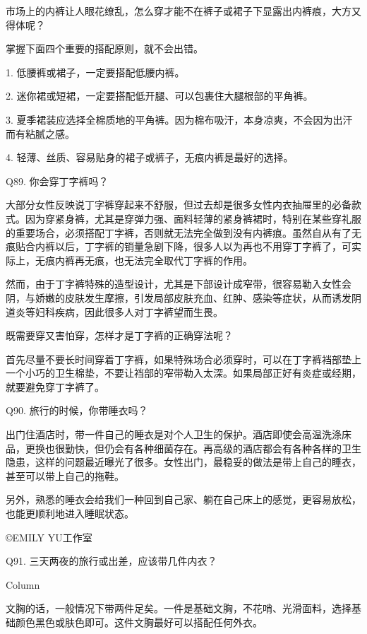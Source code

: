 \documentclass[12pt,UTF8]{ctexbook}
\begin{document}
市场上的内裤让人眼花缭乱，怎么穿才能不在裤子或裙子下显露出内裤痕，大方又得体呢？


掌握下面四个重要的搭配原则，就不会出错。

1. 低腰裤或裙子，一定要搭配低腰内裤。

2. 迷你裙或短裙，一定要搭配低开腿、可以包裹住大腿根部的平角裤。

3. 夏季裙装应选择全棉质地的平角裤。因为棉布吸汗，本身凉爽，不会因为出汗而有粘腻之感。

4. 轻薄、丝质、容易贴身的裙子或裤子，无痕内裤是最好的选择。





Q89. 你会穿丁字裤吗？


大部分女性反映说丁字裤穿起来不舒服，但过去却是很多女性内衣抽屉里的必备款式。因为穿紧身裤，尤其是穿弹力强、面料轻薄的紧身裤裙时，特别在某些穿礼服的重要场合，必须搭配丁字裤，否则就无法完全做到没有内裤痕。虽然自从有了无痕贴合内裤以后，丁字裤的销量急剧下降，很多人以为再也不用穿丁字裤了，可实际上，无痕内裤再无痕，也无法完全取代丁字裤的作用。

然而，由于丁字裤特殊的造型设计，尤其是下部设计成窄带，很容易勒入女性会阴，与娇嫩的皮肤发生摩擦，引发局部皮肤充血、红肿、感染等症状，从而诱发阴道炎等妇科疾病，因此很多人对丁字裤望而生畏。


既需要穿又害怕穿，怎样才是丁字裤的正确穿法呢？

首先尽量不要长时间穿着丁字裤，如果特殊场合必须穿时，可以在丁字裤裆部垫上一个小巧的卫生棉垫，不要让裆部的窄带勒入太深。如果局部正好有炎症或经期，就要避免穿丁字裤了。





Q90. 旅行的时候，你带睡衣吗？


出门住酒店时，带一件自己的睡衣是对个人卫生的保护。酒店即使会高温洗涤床品，更换也很勤快，但仍会有各种细菌存在。再高级的酒店都会有各种各样的卫生隐患，这样的问题最近曝光了很多。女性出门，最稳妥的做法是带上自己的睡衣，甚至可以带上自己的拖鞋。

另外，熟悉的睡衣会给我们一种回到自己家、躺在自己床上的感觉，更容易放松，也能更顺利地进入睡眠状态。

©EMILY YU工作室





Q91. 三天两夜的旅行或出差，应该带几件内衣？



Column

文胸的话，一般情况下带两件足矣。一件是基础文胸，不花哨、光滑面料，选择基础颜色黑色或肤色即可。这件文胸最好可以搭配任何外衣。
\end{document}
